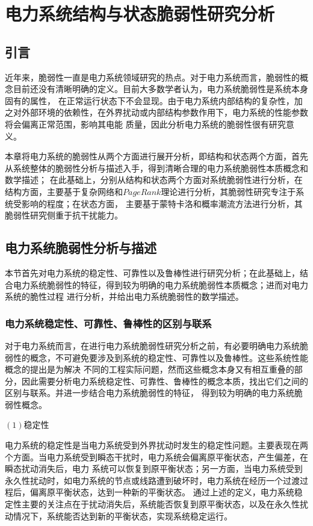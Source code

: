 \chapter{电力系统结构与状态脆弱性研究分析}
\label{cha:theory}

\section{引言}
\label{sec:index3}

近年来，脆弱性一直是电力系统领域研究的热点。对于电力系统而言，脆弱性的概念目前还没有清晰明确的定义。目前大多数学者认为，电力系统脆弱性是系统本身固有的属性，
在正常运行状态下不会显现。由于电力系统内部结构的复杂性，加之对外部环境的依赖性，在外界扰动或内部结构参数作用下，电力系统的性能参数将会偏离正常范围，影响其电能
质量，因此分析电力系统的脆弱性很有研究意义。

本章将电力系统的脆弱性从两个方面进行展开分析，即结构和状态两个方面，首先从系统整体的脆弱性分析与描述入手，得到清晰合理的电力系统脆弱性本质概念和数学描述；
在此基础上，分别从结构和状态两个方面对系统脆弱性进行分析，在结构方面，主要基于复杂网络和$PageRank$理论进行分析，其脆弱性研究专注于系统受影响的程度；在状态方面，
主要基于蒙特卡洛和概率潮流方法进行分析，其脆弱性研究侧重于抗干扰能力。

\section{电力系统脆弱性分析与描述}
\label{sec:defina}

本节首先对电力系统的稳定性、可靠性以及鲁棒性进行研究分析；在此基础上，结合电力系统脆弱性的特征，得到较为明确的电力系统脆弱性本质概念；进而对电力系统的脆性过程
进行分析，并给出电力系统脆弱性的数学描述。


\subsection{电力系统稳定性、可靠性、鲁棒性的区别与联系}
\label{sec:network}

对于电力系统而言，在进行电力系统脆弱性研究分析之前，有必要明确电力系统脆弱性的概念，不可避免要涉及到系统的稳定性、可靠性以及鲁棒性。这些系统性能概念的提出是为解决
不同的工程实际问题，然而这些概念本身又有相互重叠的部分，因此需要分析电力系统稳定性、可靠性、鲁棒性的概念本质，找出它们之间的区别与联系。并进一步结合电力系统脆弱性的特征，
得到较为明确的电力系统脆弱性概念。

$(1)$稳定性

电力系统的稳定性是当电力系统受到外界扰动时发生的稳定性问题。主要表现在两个方面。当电力系统受到瞬态干扰时，电力系统会偏离原平衡状态，产生偏差，在瞬态扰动消失后，电力
系统可以恢复到原平衡状态；另一方面，当电力系统受到永久性扰动时，如电力系统的节点或线路遭到破坏时，电力系统在经历一个过渡过程后，偏离原平衡状态，达到一种新的平衡状态。
通过上述的定义，电力系统稳定性主要的关注点在于扰动消失后，系统能否恢复到原平衡状态，以及在永久性扰动情况下，系统能否达到新的平衡状态，实现系统稳定运行。

